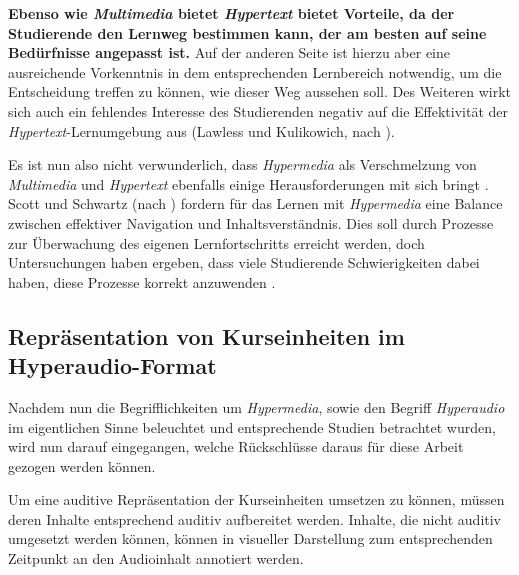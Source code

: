 
\textbf{Ebenso wie \textit{Multimedia} bietet \textit{Hypertext} bietet Vorteile, da der Studierende den Lernweg bestimmen kann, der am besten auf seine Bedürfnisse angepasst ist.} Auf der anderen Seite ist hierzu aber eine ausreichende Vorkenntnis in dem entsprechenden Lernbereich notwendig, um die Entscheidung treffen zu können, wie dieser Weg aussehen soll. Des Weiteren wirkt sich auch ein fehlendes Interesse des Studierenden negativ auf die Effektivität der \textit{Hypertext}-Lernumgebung aus (Lawless und Kulikowich, nach \cite{moos2010multimedia}).

Es ist nun also nicht verwunderlich, dass \textit{Hypermedia} als Verschmelzung von \textit{Multimedia} und \textit{Hypertext} ebenfalls einige Herausforderungen mit sich bringt \citep{moos2010multimedia}. Scott und Schwartz (nach \cite{moos2010multimedia}) fordern für das Lernen mit \textit{Hypermedia} eine Balance zwischen effektiver Navigation und Inhaltsverständnis. Dies soll durch Prozesse zur Überwachung des eigenen Lernfortschritts erreicht werden, doch Untersuchungen haben ergeben, dass viele Studierende Schwierigkeiten dabei haben, diese Prozesse korrekt anzuwenden \citep{moos2010multimedia}.



\subsection{Repräsentation von Kurseinheiten im Hyperaudio-Format}
\label{sec:hyperaudio}

Nachdem nun die Begrifflichkeiten um \textit{Hypermedia}, sowie den Begriff \textit{Hyperaudio} im eigentlichen Sinne beleuchtet und entsprechende Studien betrachtet wurden, wird nun darauf eingegangen, welche Rückschlüsse daraus für diese Arbeit gezogen werden können.

Um eine auditive Repräsentation der Kurseinheiten umsetzen zu können, müssen deren Inhalte entsprechend auditiv aufbereitet werden. Inhalte, die nicht auditiv umgesetzt werden können, können in visueller Darstellung zum entsprechenden Zeitpunkt an den Audioinhalt annotiert werden.

